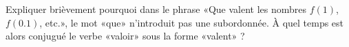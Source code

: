 
\begin{exercice}\label{exosmath-0420}

    Expliquer brièvement pourquoi dans le phrase «Que valent les nombres \( f(1)\), \( f(0.1)\), etc.», le mot «que» n'introduit pas une subordonnée. À quel temps est alors conjugué le verbe «valoir» sous la forme «valent» ?

\end{exercice}
